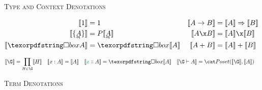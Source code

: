 \begin{figure*}
  \textsc{Type and Context Denotations}

  \begin{align*}
    \den{\tunit} &= \termO & \den{A \to B} &= \expO{\den{A}}{\den{B}}
    \\
    \den{\tseteq A} &= \pfinof{\den{\eqt A}}
    & \den{A \x B} &= \den{A} \x \den{B}
    \\
    \den{\iso A} &= \iso{\den{A}} & \den{A + B} &= \den{A} + \den{B}
  \end{align*}


  \begin{align*}
    \den{\G} &= \prod_{H \in \G} \den{H} &
    \den{\h x A} &= \den{A} & \den{\hd x A} &= \iso{\den{A}} &
    \den{\G \vdash A} &= \Poset(\den\G, \den A)
  \end{align*}

  \textsc{Term Denotations}


\end{figure*}
